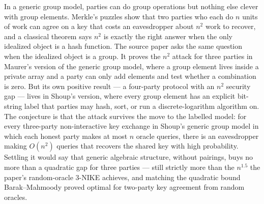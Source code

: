 \documentclass{aicr-conjecture}
\begin{document}

\vspace{0.4em}

\begin{informalconjecture}
In a generic group model, parties can do group operations but nothing
else clever with group elements. Merkle's puzzles show that two parties
who each do $n$ units of work can agree on a key that costs an
eavesdropper about $n^{2}$ work to recover, and a classical theorem says
$n^{2}$ is exactly the right answer when the only idealized object is a
hash function. The source paper asks the same question when the
idealized object is a group. It proves the $n^{2}$ attack for three
parties in Maurer's version of the generic group model, where a group
element lives inside a private array and a party can only add elements
and test whether a combination is zero. But its own positive result ---
a four-party protocol with an $n^{2}$ security gap --- lives in Shoup's
version, where every group element has an explicit bit-string label that
parties may hash, sort, or run a discrete-logarithm algorithm on. The
conjecture is that the attack survives the move to the labelled model:
for every three-party non-interactive key exchange in Shoup's generic
group model in which each honest party makes at most $n$ oracle queries,
there is an eavesdropper making $O(n^{2})$ queries that recovers the
shared key with high probability. Settling it would say that generic
algebraic structure, without pairings, buys no more than a quadratic gap
for three parties --- still strictly more than the $n^{1.5}$ the paper's
random-oracle 3-NIKE achieves, and matching the quadratic bound
Barak--Mahmoody proved optimal for two-party key agreement from random
oracles.
\end{informalconjecture}
\end{document}

